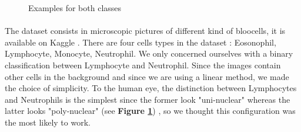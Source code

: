 \documentclass[10pt,a4paper]{article}
\begin{document}
\begin{figure}[!tbp]\label{originals}
  \centering
  \hfill
  \caption{Examples for both classes}\label{originals}
\end{figure}


\paragraph{}
The dataset consists in microscopic pictures of different kind of bloocells, it is available on Kaggle \cite{3}. There are four cells types in the dataset : Eosonophil, Lymphocyte, Monocyte, Neutrophil. We only concerned ourselves with a binary classification between Lymphocyte and Neutrophil. Since the images contain other cells in the background and since we are using a linear method, we made the choice of simplicity. To the human eye, the distinction between Lymphocytes and Neutrophils is the simplest since the former look "uni-nuclear" whereas the latter looks "poly-nuclear" (see \textbf{Figure \ref{originals}}) , so we thought this configuration was the most likely to work.
\end{document}
